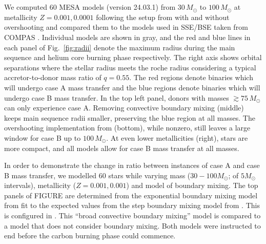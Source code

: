 \documentclass[twocolumn]{aastex63}
\begin{document}
\section{}

We computed 60 MESA models (version 24.03.1) from $30 \, M_{\odot}$ to
$100 \, M_{\odot}$ at metallicity $Z=0.001,0.0001$ following the setup
from \cite{renzo:23} with and without overshooting and compared them
to the \cite{pols:98} models used in SSE/BSE \cite{hurley:00} taken
from COMPAS \cite{stevenson:17, vignagomez:18, riley:22}. Individual
models are shown in gray, and the red and blue lines in each panel of
Fig.~\ref{fig:radii} denote the maximum radius during the main
sequence and helium core burning phase respectively. The right axis
shows orbital separations where the stellar radius meets the roche
radius \citep{eggleton:83} considering a typical accretor-to-donor
mass ratio of $q=0.55$. The red regions denote binaries which will
undergo case A mass transfer and the blue regions denote binaries
which will undergo case B mass transfer. In the top left panel, donors
with masses $ \gtrsim 75 \, M_{\odot}$ can only experience case
A. Removing convective boundary mixing (middle) keeps main sequence
radii smaller, preserving the blue region at all masses. The
overshooting implementation from \cite{pols:98} (bottom), while
nonzero, still leaves a large window for case B up to
$100 \, M_{\odot}$. At even lower metallicities (right), stars are
more compact, and all models allow for case B mass transfer at all
masses.


In order to demonstrate the change in ratio between instances of case
A and case B mass transfer, we modelled 60 stars while varying mass
($30-100 M_{\odot}$; of $5M_{\odot}$ intervals), metallicity
($Z = 0.001,0.001$) and model of boundary mixing. The top panels of
FIGURE are determined from the exponential boundary mixing model from
\cite{herwig:00} fit to the expected values from the step boundary mixing
model from \cite{brott:11}. This is configured in
\cite{claret:18}. This ``broad convective boundary mixing'' model is
compared to a model that does not consider boundary mixing. Both
models were instructed to end before the carbon burning phase could
commence.
\end{document}
